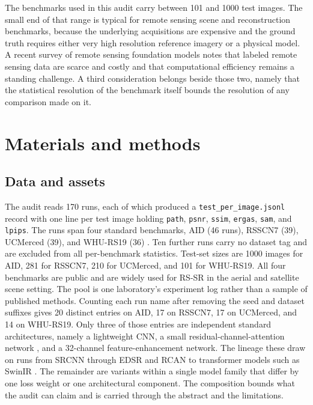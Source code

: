 \documentclass{interact}
\begin{document}
The benchmarks used in this audit carry between 101 and 1000 test images. The small end of that range is typical for remote sensing scene and reconstruction benchmarks, because the underlying acquisitions are expensive and the ground truth requires either very high resolution reference imagery or a physical model. A recent survey of remote sensing foundation models \citep{hong2026} notes that labeled remote sensing data are scarce and costly and that computational efficiency remains a standing challenge. A third consideration belongs beside those two, namely that the statistical resolution of the benchmark itself bounds the resolution of any comparison made on it.

\section{Materials and methods}\label{sec:methods}

\subsection{Data and assets}\label{sec:assets}

The audit reads 170 runs, each of which produced a \texttt{test\_\allowbreak per\_\allowbreak image.jsonl} record with one line per test image holding \texttt{path}, \texttt{psnr}, \texttt{ssim}, \texttt{ergas}, \texttt{sam}, and \texttt{lpips}. The runs span four standard benchmarks, AID (46 runs), RSSCN7 (39), UCMerced (39), and WHU-RS19 (36) \citep{xia2017,zou2015,yang2013,dai2011}. Ten further runs carry no dataset tag and are excluded from all per-benchmark statistics. Test-set sizes are 1000 images for AID, 281 for RSSCN7, 210 for UCMerced, and 101 for WHU-RS19. All four benchmarks are public and are widely used for RS-SR in the aerial and satellite scene setting. The pool is one laboratory's experiment log rather than a sample of published methods. Counting each run name after removing the seed and dataset suffixes gives 20 distinct entries on AID, 17 on RSSCN7, 17 on UCMerced, and 14 on WHU-RS19. Only three of those entries are independent standard architectures, namely a lightweight CNN, a small residual-channel-attention network \citep{zhang2018}, and a 32-channel feature-enhancement network. The lineage these draw on runs from SRCNN \citep{dong2016} through EDSR \citep{lim2017} and RCAN to transformer models such as SwinIR \citep{liang2021}. The remainder are variants within a single model family that differ by one loss weight or one architectural component. The composition bounds what the audit can claim and is carried through the abstract and the limitations.
\end{document}
